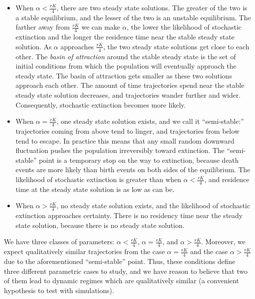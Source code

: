 \begin{example}
\begin{enumerate}[(i)]
\begin{itemize}
\item When $\alpha < \frac{rK}{4}$, there are two steady state solutions. The greater of the two is a stable equilibrium, and the lesser of the two is an unstable equilibrium. The farther away from $\frac{rK}{4}$ we can make $\alpha$, the lower the likelihood of stochastic extinction and the longer the residence time near the stable steady state solution. As $\alpha$ approaches $\frac{rK}{4}$, the two steady state solutions get close to each other. The \textit{basin of attraction} around the stable steady state is the set of initial conditions from which the population will eventually approach the steady state. The basin of attraction gets smaller as these two solutions approach each other. The amount of time trajectories spend near the stable steady state solution decreases, and trajectories wander further and wider. Consequently, stochastic extinction becomes more likely.
\item When $\alpha = \frac{rK}{4}$, one steady state solution exists, and we call it ``semi-stable:'' trajectories coming from above tend to linger, and trajectories from below tend to escape. In practice this means that any small random downward fluctuation pushes the population irreversibly toward extinction. The ``semi-stable'' point is a temporary stop on the way to extinction, because death events are more likely than birth events on both sides of the equilibrium. The likelihood of stochastic extinction is greater than when $\alpha < \frac{rK}{4}$, and residence time at the steady state solution is as low as can be.
\item When $\alpha > \frac{rK}{4}$, no steady state solution exists, and the likelihood of stochastic extinction approaches certainty. There is no residency time near the steady state solution, because there is no steady state solution.
\end{itemize}

\end{enumerate}

We have three classes of parameters: $\alpha < \frac{rK}{4}$, $\alpha = \frac{rK}{4}$, and $\alpha > \frac{rK}{4}$. Moreover, we expect qualitatively similar trajectories from the case $\alpha = \frac{rK}{4}$ and the case $\alpha > \frac{rK}{4}$ due to the aforementioned ``semi-stable'' point. Thus, these conditions define three different parametric cases to study, and we have reason to believe that two of them lead to dynamic regimes which are qualitatively similar (a convenient hypothesis to test with simulations).

\end{example}


